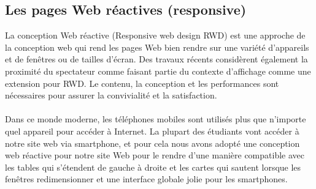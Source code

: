 \documentclass[12pt]{report}
\begin{document}
\newpage

\subsection{Les pages Web réactives (responsive)}

La conception Web réactive (Responsive web design RWD) est une approche de la conception web qui rend les pages Web bien rendre sur une variété d’appareils et de fenêtres ou de tailles d’écran. Des travaux récents considèrent également la proximité du spectateur comme faisant partie du contexte d’affichage comme une extension pour RWD. Le contenu, la conception et les performances sont nécessaires pour assurer la convivialité et la satisfaction.
\\\\
Dans ce monde moderne, les téléphones mobiles sont utilisés plus que n’importe quel appareil pour accéder à Internet. La plupart des étudiants vont accéder à notre site web via smartphone, et pour cela nous avons adopté une conception web réactive pour notre site Web pour le rendre d’une manière compatible avec les tables qui s’étendent de gauche à droite et les cartes qui sautent lorsque les fenêtres redimensionner et une interface globale jolie pour les smartphones.

\vspace{0.8in}
\end{document}
